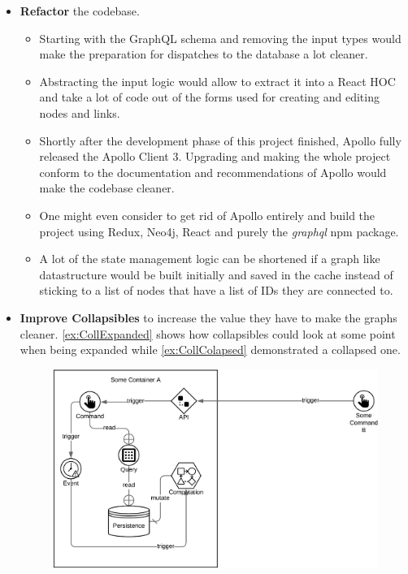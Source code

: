 \begin{itemize}
\item \textbf{Refactor} the codebase.
\begin{itemize}
\item Starting with the GraphQL schema and removing the input types would make the preparation for dispatches to the database a lot cleaner. 
\item Abstracting the input logic would allow to extract it into a React HOC and take a lot of code out of the forms used for creating and editing nodes and links.
\item Shortly after the development phase of this project finished, Apollo fully released the Apollo Client 3. Upgrading and making the whole project conform to the documentation and recommendations of Apollo would make the codebase cleaner.
\item One might even consider to get rid of Apollo entirely and build the project using Redux, Neo4j, React and purely the \emph{graphql} npm package.
\item A lot of the state management logic can be shortened if a graph like datastructure would be built initially and saved in the cache instead of sticking to a list of nodes that have a list of IDs they are connected to.
\end{itemize}

\item \textbf{Improve Collapsibles} to increase the value they have to make the graphs cleaner. \autoref{ex:CollExpanded} shows how collapsibles could look at some point when being expanded while \autoref{ex:CollColapsed} demonstrated a collapsed one.

\begin{figure}[H]
\centering
\includegraphics[scale=.35]{Bilder/CollapsableEx.png}
\label{ex:CollExpanded}


\end{figure}
\end{itemize}
